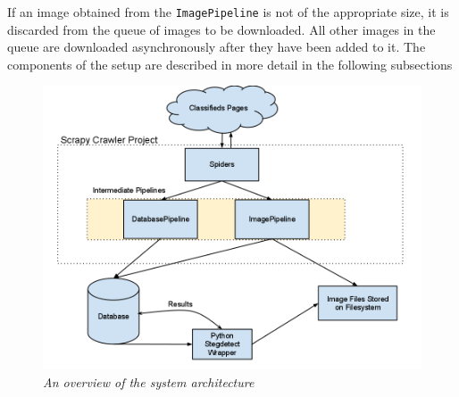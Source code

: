 If an image obtained from the \texttt{ImagePipeline} is not of the appropriate size, it is discarded from the
queue of images to be downloaded. All other images in the queue are
downloaded asynchronously after they have been added to it. The
components of the setup are described in more detail in the following
subsections


\begin{figure}[h!]
\includegraphics[scale=0.5]{ArchDiagThesis}
\caption{\emph{An overview of the system architecture}}
\label{fig:architecture}
\end{figure} 

